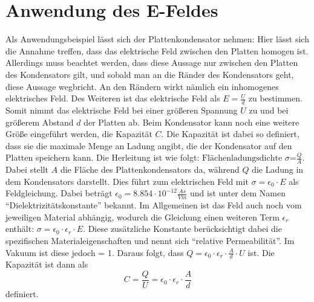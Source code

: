 \section{Anwendung des E-Feldes}
\label{sec:Plattenkondensator}
Als Anwendungsbeispiel lässt sich der Plattenkondensator nehmen:
Hier lässt sich die Annahme treffen, dass das elektrische Feld zwischen den Platten homogen ist.
Allerdings muss beachtet werden, dass diese Aussage nur zwischen den Platten des Kondensators gilt, und sobald man an die Ränder des Kondensators geht, diese Aussage wegbricht.
An den Rändern wirkt nämlich ein inhomogenes elektrisches Feld.
Des Weiteren ist das elektrische Feld als $E = \frac{U}{d}$ zu bestimmen.
Somit nimmt das elektrische Feld bei einer größeren Spannung $U$ zu und bei größerem Abstand $d$ der Platten ab.
Beim Kondensator kann noch eine weitere Größe eingeführt werden, die Kapazität $C$.
Die Kapazität ist dabei so definiert, dass sie die maximale Menge an Ladung angibt, die der Kondensator auf den Platten speichern kann.
Die Herleitung ist wie folgt:
$\mbox{Flächenladungsdichte } \sigma \mbox{=} \frac{Q}{A}$.
Dabei stellt $A$ die Fläche des Plattenkondensators da, während $Q$ die Ladung in dem Kondensators darstellt.
Dies führt zum elektrischen Feld mit $\sigma = \epsilon_0 \cdot E$ als Feldgleichung.
Dabei beträgt $\epsilon_0 = 8.854 \cdot 10^{-12} \frac{As}{Vm}$ und ist unter dem Namen "`Dielektrizitätskonstante"' bekannt.
Im Allgemeinen ist das Feld auch noch vom jeweiligen Material abhängig, wodurch die Gleichung einen weiteren Term $\epsilon_r$ enthält: $\sigma = \epsilon_0 \cdot \epsilon_r \cdot E$.
Diese zusätzliche Konstante berücksichtigt dabei die spezifischen Materialeigenschaften und nennt sich "`relative Permeabilität"'.
Im Vakuum ist diese jedoch = 1.
Daraus folgt, dass $ Q = \epsilon_0 \cdot \epsilon_r \cdot \frac{A}{d} \cdot U$ ist.
Die Kapazität ist dann als
\begin{equation*}
    C = \frac{Q}{U} = \epsilon_0 \cdot \epsilon_r \cdot \frac{A}{d}
\end{equation*}
definiert.
